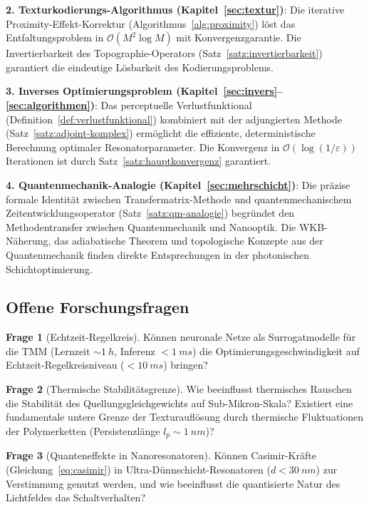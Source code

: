 ﻿\documentclass[a4paper,12pt]{article}
\theoremstyle{definition}
\newtheorem{frage}{Frage}[section]
\newcommand{\ordre}[1]{\mathcal{O}\!\left(#1\right)}
\begin{document}
	\textbf{2. Texturkodierungs-Algorithmus (Kapitel~\ref{sec:textur})}:
	Die iterative Proximity-Effekt-Korrektur (Algorithmus~\ref{alg:proximity})
	löst das Entfaltungsproblem in $\ordre{M^2\log M}$ mit Konvergenzgarantie.
	Die Invertierbarkeit des Topographie-Operators (Satz~\ref{satz:invertierbarkeit})
	garantiert die eindeutige Lösbarkeit des Kodierungsproblems.
	
	\textbf{3. Inverses Optimierungsproblem (Kapitel~\ref{sec:invers}--\ref{sec:algorithmen})}:
	Das perceptuelle Verlustfunktional (Definition~\ref{def:verlustfunktional})
	kombiniert mit der adjungierten Methode (Satz~\ref{satz:adjoint-komplex})
	ermöglicht die effiziente, deterministische Berechnung optimaler Resonatorparameter.
	Die Konvergenz in $\ordre{\log(1/\varepsilon)}$ Iterationen ist durch
	Satz~\ref{satz:hauptkonvergenz} garantiert.
	
	\textbf{4. Quantenmechanik-Analogie (Kapitel~\ref{sec:mehrschicht})}:
	Die präzise formale Identität zwischen Transfermatrix-Methode und
	quantenmechanischem Zeitentwicklungsoperator (Satz~\ref{satz:qm-analogie})
	begründet den Methodentransfer zwischen Quantenmechanik und Nanooptik.
	Die WKB-Näherung, das adiabatische Theorem und topologische Konzepte
	aus der Quantenmechanik finden direkte Entsprechungen in der photonischen
	Schichtoptimierung.
	
	\subsection{Offene Forschungsfragen}
	
	\begin{frage}[Echtzeit-Regelkreis]
		Können neuronale Netze als Surrogatmodelle für die TMM
		(Lernzeit $\sim \SI{1}{h}$, Inferenz $< \SI{1}{ms}$)
		die Optimierungsgeschwindigkeit auf Echtzeit-Regelkreisniveau
		($< \SI{10}{ms}$) bringen?
	\end{frage}
	
	\begin{frage}[Thermische Stabilitätsgrenze]
		Wie beeinflusst thermisches Rauschen die Stabilität des
		Quellungsgleichgewichts auf Sub-Mikron-Skala?
		Existiert eine fundamentale untere Grenze der Texturauflösung
		durch thermische Fluktuationen der Polymerketten
		(Persistenzlänge $l_p \sim \SI{1}{nm}$)?
	\end{frage}
	
	\begin{frage}[Quanteneffekte in Nanoresonatoren]
		Können Casimir-Kräfte (Gleichung~\eqref{eq:casimir}) in
		Ultra-Dünnschicht-Resonatoren ($d < \SI{30}{nm}$) zur
		Verstimmung genutzt werden, und wie beeinflusst die
		quantisierte Natur des Lichtfeldes das Schaltverhalten?
	\end{frage}
	
\end{document}
